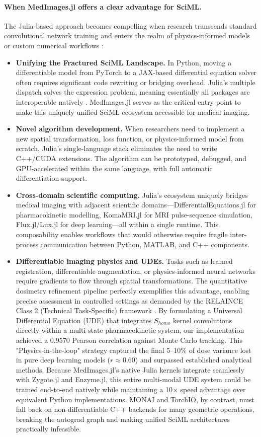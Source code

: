 \documentclass[10pt,letterpaper]{article}
\begin{document}
\paragraph{When MedImages.jl offers a clear advantage for SciML.}
The Julia-based approach becomes compelling when research transcends standard convolutional network training and enters the realm of physics-informed models or custom numerical workflows \cite{RoeschGreener2023}:
\begin{itemize}
    \item \textbf{Unifying the Fractured SciML Landscape.} In Python, moving a differentiable model from PyTorch to a JAX-based differential equation solver often requires significant code rewriting or bridging overhead. Julia's multiple dispatch solves the expression problem, meaning essentially all packages are interoperable natively \cite{PalBhattacharya2024, EschleGl2023}. MedImages.jl serves as the critical entry point to make this uniquely unified SciML ecosystem accessible for medical imaging.
    \item \textbf{Novel algorithm development.} When researchers need to implement a new spatial transformation, loss function, or physics-informed model from scratch, Julia's single-language stack eliminates the need to write C++/CUDA extensions. The algorithm can be prototyped, debugged, and GPU-accelerated within the same language, with full automatic differentiation support.
    \item \textbf{Cross-domain scientific computing.} Julia's ecosystem uniquely bridges medical imaging with adjacent scientific domains---DifferentialEquations.jl for pharmacokinetic modelling, KomaMRI.jl \cite{CastilloPassiCoronado2023} for MRI pulse-sequence simulation, Flux.jl/Lux.jl \cite{pal2023lux} for deep learning---all within a single runtime. This composability enables workflows that would otherwise require fragile inter-process communication between Python, MATLAB, and C++ components.
    \item \textbf{Differentiable imaging physics and UDEs.} Tasks such as learned registration, differentiable augmentation, or physics-informed neural networks require gradients to flow through spatial transformations. The quantitative dosimetry refinement pipeline perfectly exemplifies this advantage, enabling precise assessment in controlled settings as demanded by the RELAINCE Class 2 (Technical Task-Specific) framework \cite{JhaBradshaw2022}. By formulating a Universal Differential Equation (UDE) that integrates $S_{homo}$ kernel convolutions directly within a multi-state pharmacokinetic system, our implementation achieved a $0.9570$ Pearson correlation against Monte Carlo tracking. This "Physics-in-the-loop" strategy captured the final 5--10\% of dose variance lost in pure deep learning models ($r \approx 0.60$) and surpassed established analytical methods. Because MedImages.jl's native Julia kernels integrate seamlessly with Zygote.jl and Enzyme.jl, this entire multi-modal UDE system could be trained end-to-end natively while maintaining a 10$\times$ speed advantage over equivalent Python implementations. MONAI and TorchIO, by contrast, must fall back on non-differentiable C++ backends for many geometric operations, breaking the autograd graph and making unified SciML architectures practically infeasible.

\end{itemize}
\end{document}
